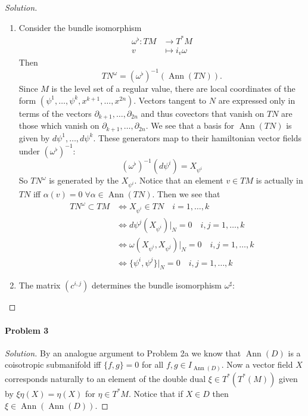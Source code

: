 \begin{proof}[Solution]\leavevmode
	\begin{enumerate}[label=\alph*.]
		\item Consider the bundle isomorphism
\begin{align*}
	\omega^\flat: TM &\longrightarrow T^*M \\
	v &\longmapsto i_v\omega
\end{align*}
Then 
\[T N^\omega=(\omega^\flat )^{-1}(\operatorname{Ann}(T N)).\]
Since $M$ is the level set of a regular value, there are local coordinates of the form $(\psi^1,\ldots,\psi^k,x^{k+1},\ldots,x^{2n})$. Vectors tangent to $N$ are expressed only in terms of the vectors $\partial_{k+1},\ldots,\partial_{2n}$ and thus covectors that vanish on $T N$ are those which vanish on $\partial_{k+1},\ldots, \partial_{2n}$. We see that a basis for $\operatorname{Ann}(T N)$ is given by $d\psi^1,\ldots,d\psi^k$. These generators map to their hamiltonian vector fields under $(\omega^\flat)^{-1}$:
\[\left(\omega^\flat \right)^{-1}(d\psi^i)=X_{\psi^i}\]
So $T N^\omega$ is generated by the $X_{\psi^i}$. {\color{magenta}Notice} that an element $v \in TM$ is actually in $T N$ iff $\alpha(v)=0\;\forall \alpha\in\operatorname{Ann}(T N) $. Then we see that
\begin{align*}
	T N^\omega\subset TM&\iff X_{\psi^i}\in T N\quad i=1,\ldots,k\\
	&\iff d\psi^j(X_{\psi^i})|_{N}=0 \quad i,j=1,\ldots,k\\
	&\iff \omega(X_{\psi^i},X_{\psi^j})|_{N}=0\quad i,j=1,\ldots,k\\
	&\iff \{\psi^i,\psi^j\}|_{N}=0\quad i,j=1,\ldots,k
\end{align*}

\item The matrix $(c^{i,j})$ determines the bundle isomorphism $\omega^\sharp:$
	\end{enumerate}
\end{proof}

\paragraph{Problem 3}

\begin{proof}[Solution]\leavevmode
	By an analogue argument to Problem 2a we know that $\operatorname{Ann}(D)$ is a coisotropic submanifold iff $\{f,g\} =0$ for all $f,g\in I_{\operatorname{Ann}(D)}$. Now a vector field $X$ corresponds naturally to an element of the double dual $\xi \in T^*(T^*(M))$ given by $\xi\eta(X)=\eta(X)$ for  $\eta\in T^*M$. Notice that if $X \in D$ then $\xi \in \operatorname{Ann}(\operatorname{Ann}(D) ) $.
\end{proof}


